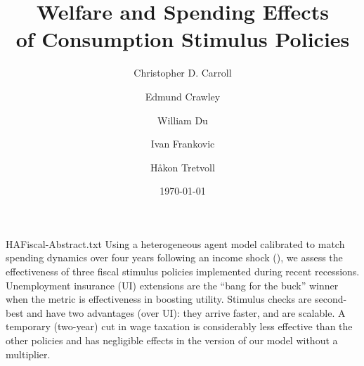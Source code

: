 \documentclass[\latexroot/HAFiscal]{subfiles}
\begin{document}
\webonly{
  \newcommand{\versn}{Web}
}

\title{Welfare and Spending Effects \\ of Consumption Stimulus Policies}

\author{Christopher D. Carroll\authNum \and Edmund Crawley\authNum \and William Du\authNum \and Ivan Frankovic\authNum \and H{\aa}kon Tretvoll\authNum}



\date{\today}

\maketitle
\vspace{-0.5\baselineskip}

\whenintegrated{\label{abstract}} 
\begin{verbatimwrite}{HAFiscal-Abstract.txt}
  Using a heterogeneous agent model calibrated to match spending dynamics over four years following an income shock (\cite{fagereng-mpc-2021}), we assess the effectiveness of three fiscal stimulus policies implemented during recent recessions.  Unemployment insurance (UI) extensions are the ``bang for the buck'' winner when the metric is effectiveness in boosting utility.  Stimulus checks are second-best and have two advantages (over UI): they arrive faster, and are scalable.  A temporary (two-year) cut in wage taxation is considerably less effective than the other policies and has negligible effects in the version of our model without a multiplier.
\end{verbatimwrite}
\begin{abstract}
  
\end{abstract}
\vspace{-0.5\baselineskip}

\whenintegrated{\label{links}} 
\end{document}
